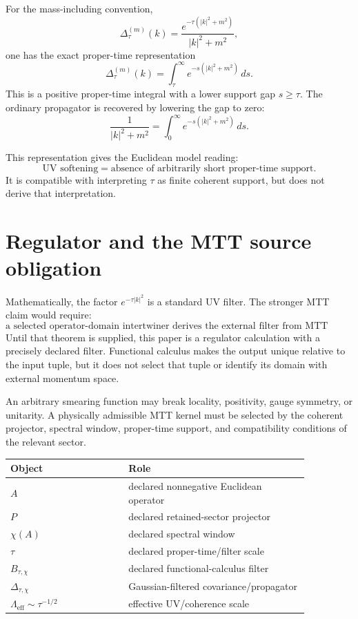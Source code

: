 \documentclass[11pt]{article}
\begin{document}
For the mass-including convention,
\[
        \Delta_\tau^{(m)}(k)
        =
        \frac{e^{-\tau(|k|^2+m^2)}}{|k|^2+m^2},
\]
one has the exact proper-time representation
\[
        \Delta_\tau^{(m)}(k)
        =
        \int_{\tau}^{\infty} e^{-s(|k|^2+m^2)}\,ds .
\]
This is a positive proper-time integral with a lower support gap \(s\ge\tau\). The ordinary propagator is recovered by lowering the gap to zero:
\[
        \frac{1}{|k|^2+m^2}
        =
        \int_{0}^{\infty} e^{-s(|k|^2+m^2)}\,ds.
\]

This representation gives the Euclidean model reading:
\[
        \boxed{\text{UV softening}=\text{absence of arbitrarily short proper-time support}.}
\]
It is compatible with interpreting \(\tau\) as finite coherent support, but does not derive that
interpretation.

\section{Regulator and the MTT source obligation}

Mathematically, the factor \(e^{-\tau |k|^2}\) is a standard UV filter.  The stronger MTT
claim would require:
\[
        \boxed{
        \text{a selected operator-domain intertwiner derives the external filter from MTT geometry.}
        }
\]
Until that theorem is supplied, this paper is a regulator calculation with a precisely declared
filter.  Functional calculus makes the output unique relative to the input tuple, but it does
not select that tuple or identify its domain with external momentum space.

An arbitrary smearing function may break locality, positivity, gauge symmetry, or unitarity. A physically admissible MTT kernel must be selected by the coherent projector, spectral window, proper-time support, and compatibility conditions of the relevant sector.

\begin{center}
\begin{tabular}{p{0.34\linewidth}p{0.52\linewidth}}
\toprule
Object & Role \\
\midrule
\(A\) & declared nonnegative Euclidean operator \\
\(P\) & declared retained-sector projector \\
\(\chi(A)\) & declared spectral window \\
\(\tau\) & declared proper-time/filter scale \\
\(B_{\tau,\chi}\) & declared functional-calculus filter \\
\(\Delta_{\tau,\chi}\) & Gaussian-filtered covariance/propagator \\
\(\Lambda_{\mathrm{eff}}\sim\tau^{-1/2}\) & effective UV/coherence scale \\
\bottomrule
\end{tabular}
\end{center}
\end{document}
